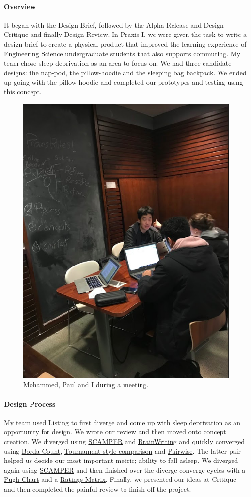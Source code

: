 \documentclass[paper=a4, fontsize=11pt]{article} %
\begin{document}
        \paragraph{Overview}
        It began with the Design Brief, followed by the Alpha Release and Design Critique and finally Design Review. In Praxis I, we were given the task to write a design brief to create a physical product that improved the learning experience of Engineering Science undergraduate students that also supports commuting. My team chose sleep deprivation as an area to focus on. We had three candidate designs: the nap-pod, the pillow-hoodie and the sleeping bag backpack. We ended up going with the pillow-hoodie and completed our prototypes and testing using this concept. 
        \begin{figure}[H]
            \centering
            \includegraphics[width=0.6\linewidth]{praxis12.png}
            \caption{Mohammed, Paul and I during a meeting.}
        \end{figure}
        \paragraph{Design Process}
        My team used \hyperlink{listlink}{Listing} to first diverge and come up with sleep deprivation as an opportunity for design. We wrote our review and then moved onto concept creation. We diverged using \hyperlink{scamplink}{SCAMPER} and \hyperlink{bwlink}{BrainWriting} and quickly converged using \hyperlink{boardlink}{Borda Count}, \hyperlink{tourlink}{Tournament style comparison} and \hyperlink{pairlink}{Pairwise}. The latter pair helped us decide our most important metric; ability to fall asleep. We diverged again using \hyperlink{scamplink}{SCAMPER} and then finished over the diverge-converge cycles with a \hyperlink{pughlink}{Pugh Chart} and a \hyperlink{ratlink}{Ratings Matrix}. Finally, we presented our ideas at Critique and then completed the painful review to finish off the project.
\end{document}
